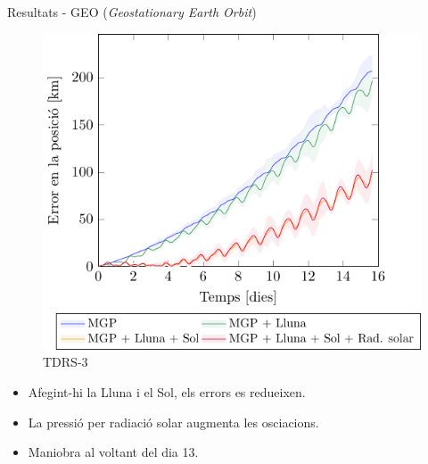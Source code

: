 \documentclass{beamer} %
\begin{document}
\begin{frame}{Resultats - GEO (\emph{Geostationary Earth Orbit})}
  \begin{minipage}{0.48\textwidth}
    \begin{figure}[ht]
      \centering
      \includegraphics[width=\textwidth]{../Images/simulation/TDRS-3_ca.pdf}
      \caption{TDRS-3}
    \end{figure}
  \end{minipage}
  \hfill
  \begin{minipage}{0.48\textwidth}
    \begin{itemize}
      \item Afegint-hi la Lluna i el Sol, els errors es redueixen.
      \item La pressió per radiació solar augmenta les osci\lgem acions.
      \item Maniobra al voltant del dia 13.
    \end{itemize}
  \end{minipage}
\end{frame}
\end{document}
